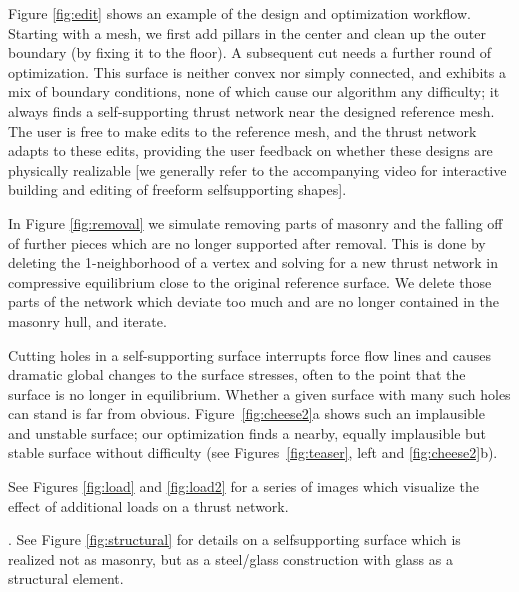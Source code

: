 \documentclass[review]{acmsiggraph}
\begin{document}
Figure \ref{fig:edit} shows an example of the design and optimization
workflow. Starting with a mesh, we first add pillars in the center
and clean up the outer boundary (by fixing it to the floor). A subsequent
cut needs a further round of optimization.
This surface is neither convex nor simply connected, and
exhibits a mix of boundary conditions, none of which cause our algorithm
any difficulty; it always finds a self-supporting thrust network near the
designed reference mesh. The user is free to make edits to the
reference mesh, and the thrust network adapts to these edits, providing
the user feedback on whether these designs are physically realizable
[we generally refer to the accompanying video for interactive building and editing
of freeform self\dash supporting shapes].

In Figure \ref{fig:removal} we simulate removing parts of masonry and
the falling off of further pieces which are no longer supported after
removal.
This is done by deleting the 1-neighborhood of a vertex
and solving for a new thrust network in compressive equilibrium
close to the original reference surface. We delete those parts of the
network which deviate too much and are no longer contained in the masonry
hull, and iterate.



Cutting holes in a self-supporting surface interrupts force flow lines and
causes dramatic global changes to the surface stresses, often to the point
that the surface is no longer in equilibrium. Whether a given surface with
many such holes can stand is far from obvious. Figure~\ref{fig:cheese2}a
shows such an implausible and unstable surface; our optimization finds a
nearby, equally implausible but stable surface without difficulty (see
Figures~\ref{fig:teaser}, left and \ref{fig:cheese2}b).

 See Figures \ref{fig:load} and
\ref{fig:load2} for a series of images which visualize the effect of
additional loads on a thrust network.


. See Figure \ref{fig:structural} for
details on a self\dash supporting surface which is realized
not as masonry, but as a steel\slash glass construction with glass as
a structural element.
\end{document}
